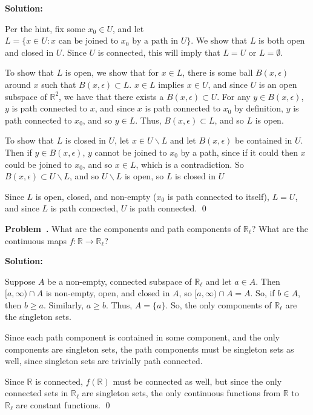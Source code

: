 \documentclass[11pt]{article}
\newcounter{problemCounter}
\newenvironment{problem}[1][]{\begin{shaded}\refstepcounter{problemCounter}\par\medskip
        \noindent \textbf{Problem~\theproblemCounter. #1}}{\end{shaded}\medskip}
\newenvironment{solution}{\textbf{Solution:}}{\qed\newpage}
\newcommand{\R}{\mathbb{R}}
\newcommand{\sk}{\smallskip}
\newcommand{\bs}{\backslash}
\begin{document}
\begin{solution}

\noindent Per the hint, fix some $x_0 \in U$, and let $L = \{x \in U : \text{$x$ can be joined to $x_0$ by a path in $U$}\}$. We show that $L$ is both open and closed in $U$. Since $U$ is connected, this will imply that $L = U$ or $L = \emptyset$.

\sk

\noindent To show that $L$ is open, we show that for $x \in L$, there is some ball $B(x, \epsilon)$ around $x$ such that $B(x, \epsilon) \subset L$. $x \in L$ implies $x \in U$, and since $U$ is an open subspace of $\R^2$, we have that there exists a $B(x, \epsilon) \subset U$. For any $y \in B(x, \epsilon)$, $y$ is path connected to $x$, and since $x$ is path connected to $x_0$ by definition, $y$ is path connected to $x_0$, and so $y \in L$. Thus, $B(x, \epsilon) \subset L$, and so $L$ is open.

\sk

\noindent To show that $L$ is closed in $U$, let $x \in U \bs L$ and let $B(x, \epsilon)$ be contained in $U$. Then if $y \in B(x, \epsilon)$, $y$ cannot be joined to $x_0$ by a path, since if it could then $x$ could be joined to $x_0$, and so $x \in L$, which is a contradiction. So $B(x, \epsilon) \subset U\bs L$, and so $U \bs L$ is open, so $L$ is closed in $U$

\sk

\noindent Since $L$ is open, closed, and non-empty ($x_0$ is path connected to itself), $L = U$, and since $L$ is path connected, $U$ is path connected.
\end{solution}

\begin{problem}
\noindent What are the components and path components of $\R_\ell$? What are the continuous maps $f: \R \rightarrow \R_\ell$?
\end{problem}

\begin{solution}


\noindent Suppose $A$ be a non-empty, connected subspace of $\R_\ell$ and let $a \in A$. Then $[a, \infty) \cap A$ is non-empty, open, and closed in $A$, so $[a, \infty) \cap A = A$. So, if $b \in A$, then $b \geq a$. Similarly, $a \geq b$. Thus, $A = \{a\}$. So, the only components of $\R_\ell$ are the singleton sets. 

\sk

\noindent Since each path component is contained in some component, and the only components are singleton sets, the path components must be singleton sets as well, since singleton sets are trivially path connected.

\sk

\noindent Since $\R$ is connected, $f(\R)$ must be connected as well, but since the only connected sets in $\R_\ell$ are singleton sets, the only continuous functions from $\R$ to $\R_\ell$ are constant functions. 
\end{solution}
\end{document}
